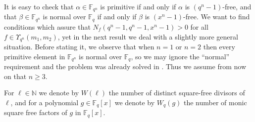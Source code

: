 \documentclass[12pt]{article}
\newcommand{\F}{\mathbb{F}}
\begin{document}
It is easy to check that 
$\alpha \in \F_{q^n}$ is primitive if and only if $\alpha$ is $(q^n-1)$-free, 
and 
that $\beta \in \mathbb{F}_{q^n}$ is normal over $\mathbb{F}_q$ if and only 
if $\beta$ is $(x^n - 1)$-free. We want to find conditions which assure that
$N_{f}(q^n-1,q^n-1,x^n-1)>0$ for all
$f \in \Upsilon_{q^n} (m_1,m_2)$, yet in the next result we deal with a 
slightly more general situation. Before stating it, we observe that when $n = 
1$ or $n = 2$ then every primitive element in $\mathbb{F}_{q^n}$ is normal over 
$\mathbb{F}_q$, so we may ignore the ``normal''  requirement and  the problem 
was already solved in \cite{CSS}. Thus we assume from now on that $n \geq 
3$. 



For $\ell \in \mathbb{N}$ we denote by $W(\ell)$ the number of 
distinct square-free  divisors of $\ell$, and
for a polynomial $g \in \F_q[x]$ we denote by
$W_q(g)$ the number
of monic square free factors of $g$ in $\F_{q}[x]$. 
\end{document}
